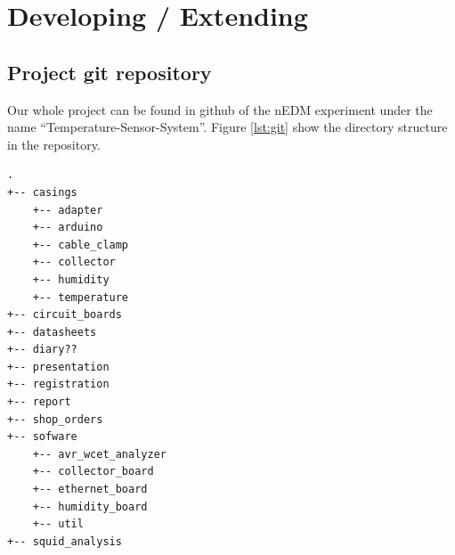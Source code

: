 \documentclass[a4paper]{scrreprt}
\begin{document}
\section{Developing / Extending}
\subsection{Project git repository}
Our whole project can be found in github of the nEDM experiment under the name ``Temperature-Sensor-System''. Figure \ref{lst:git} show the directory structure  in the repository.
\lstset{style=mathstyle}
\begin{lstlisting}[xleftmargin=25pt, xrightmargin=25pt,framexleftmargin=10pt,framextopmargin=10pt, framexbottommargin=10pt, caption={Directory structure in the project git repository}, label={lst:git}]
.
+-- casings
    +-- adapter
    +-- arduino
    +-- cable_clamp
    +-- collector
    +-- humidity
    +-- temperature
+-- circuit_boards
+-- datasheets
+-- diary??
+-- presentation
+-- registration
+-- report
+-- shop_orders
+-- sofware
    +-- avr_wcet_analyzer
    +-- collector_board
    +-- ethernet_board
    +-- humidity_board
    +-- util
+-- squid_analysis
\end{lstlisting}
\end{document}
